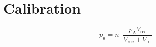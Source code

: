\chapter{Calibration}

\begin{equation}
	p_n = n \cdot \frac{p_\text{A} V_\text{rec}}{V_\text{rec} + V_\text{ref}}
\end{equation}
